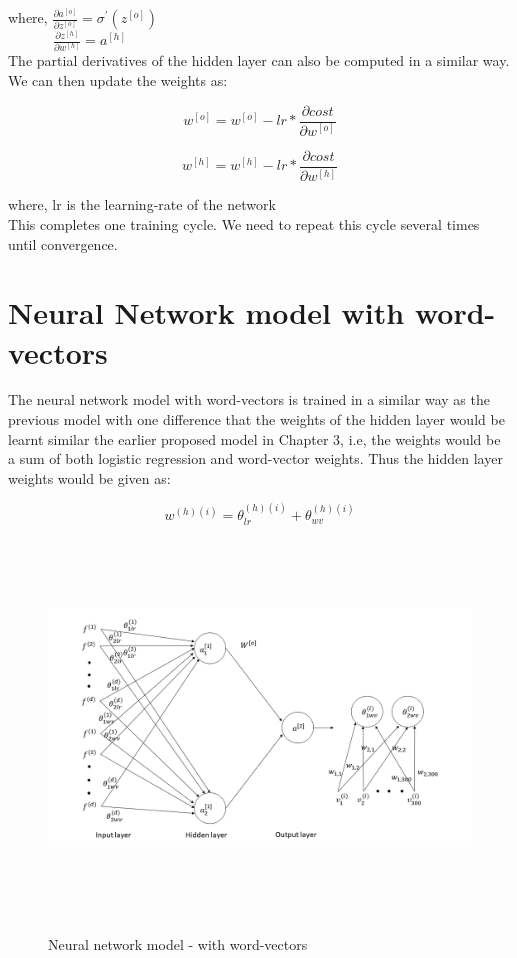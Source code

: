 where, $\frac{\partial a^{[o]}}{\partial z^{[o]}} =  \sigma^{'}(z^{[o]})$\\

$\quad\qquad\ \frac{\partial z^{[h]}}{\partial w^{[h]}} = a^{[h]}$ \\

The partial derivatives of the hidden layer can also be computed in a similar way. We can then update the weights as:

\begin{equation}
w^{[o]} = w^{[o]} - lr * \frac{\partial cost}{\partial w^{[o]}}
\end{equation}

\begin{equation}
w^{[h]} = w^{[h]} - lr * \frac{\partial cost}{\partial w^{[h]}}
\end{equation}

where, lr is the learning-rate of the network\\

This completes one training cycle. We need to repeat this cycle several times until convergence.

\newpage
\section{Neural Network model with word-vectors}

The neural network model with word-vectors is trained in a similar way as the previous model with one difference that the weights of the hidden layer would be learnt similar the earlier proposed model in Chapter 3, i.e, the weights would be a sum of both logistic regression and word-vector weights. Thus the hidden layer weights would be given as:

\begin{equation}
w^{(h)(i)} = \theta_{lr}^{(h)(i)} + \theta_{wv}^{(h)(i)}
\end{equation}

\begin{figure}[htbp]
\centering
\includegraphics[width=16cm, height=10cm]{images/proposed_method_nn.png}\\
\centering
\caption{Neural network model - with word-vectors}
\label{fig:foo}
\end{figure}


